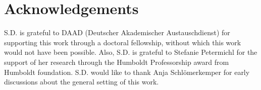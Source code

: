\documentclass{article}
\begin{document}
\section{Acknowledgements}
S.D. is grateful to DAAD (Deutscher Akademischer Austauschdienst) for supporting this work through a doctoral fellowship, without which this work would not have been possible. Also, S.D. is grateful to Stefanie Petermichl for the support of her research through the Humboldt Professorship award from Humboldt foundation. S.D. would like to thank Anja Schlömerkemper for early discussions about the general setting of this work.


 
\end{document}
